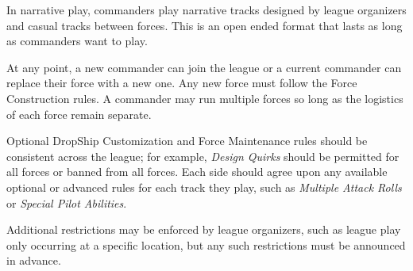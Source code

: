 In narrative play, commanders play narrative tracks designed by league organizers and casual tracks between forces.
This is an open ended format that lasts as long as commanders want to play.

At any point, a new commander can join the league or a current commander can replace their force with a new one.
Any new force must follow the Force Construction rules.
A commander may run multiple forces so long as the logistics of each force remain separate.

Optional DropShip Customization and Force Maintenance rules should be consistent across the league; for example, \emph{Design Quirks} should be permitted for all forces or banned from all forces.
Each side should agree upon any available optional or advanced rules for each track they play, such as \emph{Multiple Attack Rolls} or \emph{Special Pilot Abilities}.

Additional restrictions may be enforced by league organizers, such as league play only occurring at a specific location, but any such restrictions must be announced in advance.
